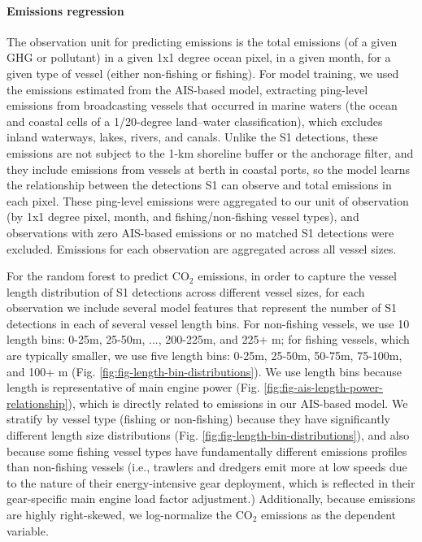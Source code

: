 \documentclass[lineno,pdflatex,sn-nature]{sn-jnl}
\begin{document}
\paragraph{Emissions regression} The observation unit for predicting emissions is the total emissions (of a given GHG or pollutant) in a given 1x1 degree ocean pixel, in a given month, for a given type of vessel (either non-fishing or fishing). For model training, we used the emissions estimated from the AIS-based model, extracting ping-level emissions from broadcasting vessels that occurred in marine waters (the ocean and coastal cells of a 1/20-degree land--water classification), which excludes inland waterways, lakes, rivers, and canals. Unlike the S1 detections, these emissions are not subject to the 1-km shoreline buffer or the anchorage filter, and they include emissions from vessels at berth in coastal ports, so the model learns the relationship between the detections S1 can observe and total emissions in each pixel. These ping-level emissions were aggregated to our unit of observation (by 1x1 degree pixel, month, and fishing/non-fishing vessel types), and observations with zero AIS-based emissions or no matched S1 detections were excluded. Emissions for each observation are aggregated across all vessel sizes. 

For the random forest to predict CO$_2$ emissions, in order to capture the vessel length distribution of S1 detections across different vessel sizes, for each observation we include several model features that represent the number of S1 detections in each of several vessel length bins. For non-fishing vessels, we use 10 length bins: 0-25m, 25-50m, ..., 200-225m, and 225+ m;  for fishing vessels, which are typically smaller, we use five length bins: 0-25m, 25-50m, 50-75m, 75-100m, and 100+ m (Fig. \ref{fig:fig-length-bin-distributions}). We use length bins because length is representative of main engine power (Fig. \ref{fig:fig-ais-length-power-relationship}), which is directly related to emissions in our AIS-based model. We stratify by vessel type (fishing or non-fishing) because they have significantly different length size distributions (Fig. \ref{fig:fig-length-bin-distributions}), and also because some fishing vessel types have fundamentally different emissions profiles than non-fishing vessels (i.e., trawlers and dredgers emit more at low speeds due to the nature of their energy-intensive gear deployment, which is reflected in their gear-specific main engine load factor adjustment.) Additionally, because emissions are highly right-skewed, we log-normalize the CO$_2$ emissions as the dependent variable. 
\end{document}
